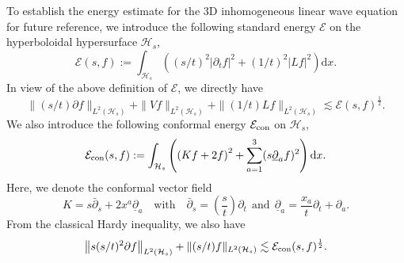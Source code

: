 \documentclass[a4paper,reqno]{amsart}
\theoremstyle{definition}
\numberwithin{equation}{section}
\def \d {{\rm{d}}}
\begin{document}
 To establish the energy estimate for the 3D inhomogeneous linear wave equation for future reference, we introduce the following standard energy $\mathcal{E}$ on the hyperboloidal hypersurface $\mathcal{H}_{s}$,
 \begin{equation}
 \label{def:standardenergy}
     \mathcal{E}(s,f){:=}\int_{\mathcal{H}_{s}}\left((s/t)^{2}|\partial_{t}f|^{2}+(1/t)^{2}|L f|^{2}\right)\mathrm{d}x.
 \end{equation}
In view of the above definition of $\mathcal{E}$, we directly have 
 \begin{equation}\label{est:L2energy}
     \|(s/t)\partial f\|_{L^{2}(\mathcal{H}_{s})}+\|Vf\|_{L^{2}(\mathcal{H}_{s})}+
      \|(1/t)L f\|_{L^{2}(\mathcal{H}_{s})}\lesssim \mathcal{E}(s,f)^{\frac{1}{2}}.
 \end{equation}
 We also introduce the following conformal energy $\mathcal{E}_{\rm{con}}$ on $\mathcal{H}_{s}$,
 \begin{equation*}
     \mathcal{E}_{\rm{con}}(s,f):=\int_{\mathcal{H}_{s}}
     \left(\left(Kf+2f\right)^{2}
     +\sum_{a=1}^{3}(s{\underline{\partial}}_{a}f)^{2}
     \right)\d x.
 \end{equation*}
 Here, we denote the conformal vector field
 \begin{equation*}
     K=s\bar{\partial}_{s}+2x^{a} {\underline{\partial}}_{a}\quad \mbox{with}\quad 
      \bar{\partial}_{s}=\left(\frac{s}{t}\right)\partial_{t} \ \ \mbox{and} \ \
     {\underline{\partial}}_{a}=\frac{x_{a}}{t}\partial_{t}+\partial_{a}.
 \end{equation*}
 From the classical Hardy inequality, we also have
 \begin{equation}\label{est:L2conenergy}
     \left\|s(s/t)^{2}\partial f\right\|_{L^{2}(\mathcal{H}_{s})}+\|(s/t)f\|_{L^{2}(\mathcal{H}_{s})}\lesssim \mathcal{E}_{\rm{con}}(s,f)^{\frac{1}{2}}.
 \end{equation}
 
\end{document}
